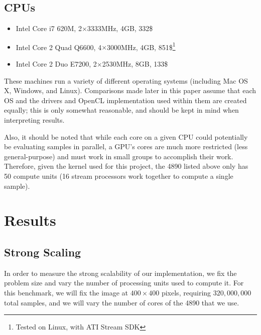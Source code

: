 \documentclass{acmsiggraph}
\begin{document}
\subsection{CPUs}

\begin{itemize}

\item Intel Core i7 620M, 2$\times$3333MHz, 4GB, 332\$

\item Intel Core 2 Quad Q6600, 4$\times$3000MHz, 4GB, 851\$\footnote{Tested on Linux, with ATI Stream SDK\label{fn:linux}}

\item Intel Core 2 Duo E7200, 2$\times$2530MHz, 8GB, 133\$

\end{itemize}

These machines run a variety of different operating systems (including Mac OS X, Windows, and Linux). Comparisons made later in this paper assume that each OS and the drivers and OpenCL implementation used within them are created equally; this is only somewhat reasonable, and should be kept in mind when interpreting results.

Also, it should be noted that while each core on a given CPU could potentially be evaluating samples in parallel, a GPU's cores are much more restricted (less general-purpose) and must work in small groups to accomplish their work. Therefore, given the kernel used for this project, the 4890 listed above only has 50 compute units (16 stream processors work together to compute a single sample).

\section{Results}

\subsection{Strong Scaling}

\label{strongScaling}

In order to measure the strong scalability of our implementation, we fix the problem size and vary the number of processing units used to compute it. For this benchmark, we will fix the image at $400\times400$ pixels, requiring $320,000,000$ total samples, and we will vary the number of cores of the 4890 that we use.
\end{document}
